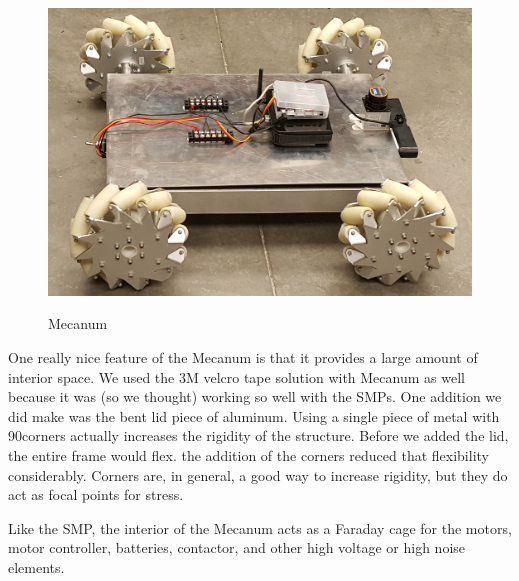 \begin{figure}[h]
\centering
\includegraphics[width=\textwidth]{mecanumrobot.png}
\label{fig:mecanum}
\caption{Mecanum}
\end{figure}

One really nice feature of the Mecanum is that it provides a large amount of interior space. We used the 3M velcro tape solution with Mecanum as well because it was (so we thought) working so well with the SMPs. One addition we did make was the bent lid piece of aluminum. Using a single piece of metal with 90\degree corners actually increases the rigidity of the structure. Before we added the lid, the entire frame would flex. the addition of the corners reduced that flexibility considerably. Corners are, in general, a good way to increase rigidity, but they do act as focal points for stress.

Like the SMP, the interior of the Mecanum acts as a Faraday cage for the motors, motor controller, batteries, contactor, and other high voltage or high noise elements.